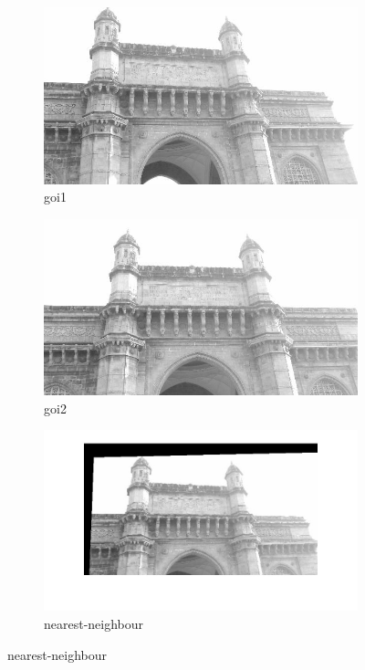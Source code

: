 \documentclass[a4paper]{article}
\begin{document}
\begin{figure}[H]
\begin{subfigure}{.4\textwidth}
  \centering
  \includegraphics[width=.8\linewidth]{goi1.jpg}  
  \caption{goi1}
  
\end{subfigure}
\begin{subfigure}{.4\textwidth}
  \centering
  \includegraphics[width=.8\linewidth]{goi2_downsampled.jpg}  
  \caption{goi2}
  
\end{subfigure}



\begin{subfigure}{.4\textwidth}
  \centering
  \includegraphics[width=.8\linewidth]{nearest_neighbour.jpg}  
  \caption{nearest-neighbour}
  

\end{subfigure}
\end{figure}
\end{document}
